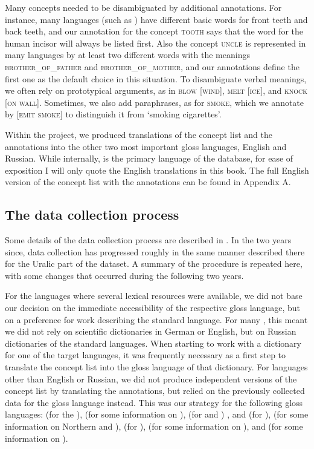Many concepts needed to be disambiguated by additional annotations. For instance, many languages (such as ) have different basic words for front teeth and back teeth, and our annotation for the concept \textsc{tooth} says that the word for the human incisor will always be listed first. Also the concept \textsc{uncle} is represented in many languages by at least two different words with the meanings \textsc{brother\_of\_father} and \textsc{brother\_of\_mother}, and our annotations define the first one as the default choice in this situation. To disambiguate verbal meanings, we often rely on prototypical arguments, as in \textsc{blow [wind]}, \textsc{melt [ice]}, and \textsc{knock [on wall]}. Sometimes, we also add paraphrases, as for \textsc{smoke}, which we annotate by \textsc{[emit smoke]} to distinguish it from `smoking cigarettes'.

Within the project, we produced translations of the concept list and the annotations into the other two most important gloss languages, English and Russian. While internally,  is the primary language of the database, for ease of exposition I will only quote the English translations in this book. The full English version of the concept list with the annotations can be found in Appendix A.

\subsection{The data collection process}
Some details of the data collection process are described in \cite{dellert2015a}. In the two years since, data collection has progressed roughly in the same manner described there for the Uralic part of the dataset. A summary of the procedure is repeated here, with some changes that occurred during the following two years.

For the languages where several lexical resources were available, we did not base our decision on the immediate accessibility of the respective gloss language, but on a preference for work describing the standard language. For many , this meant we did not rely on scientific dictionaries in German or English, but on Russian dictionaries of the standard languages. When starting to work with a dictionary for one of the target languages, it was frequently necessary as a first step to translate the concept list into the gloss language of that dictionary. For languages other than English or Russian, we did not produce independent versions of the concept list by translating the annotations, but relied on the previously collected data for the gloss language instead. This was our strategy for the following gloss languages:  (for the ),  (for some information on ),  (for  and )
,  and  (for ),  (for some information on Northern  and ),  (for ),  (for some information on ), and  (for some information on ).

